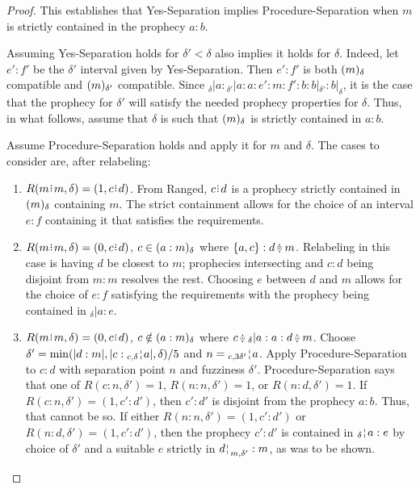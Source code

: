 \documentclass[12pt]{article}
\begin{document}
\begin{proof}
    This establishes that Yes-Separation implies Procedure-Separation when $m$ is strictly contained in the prophecy $a:b$.

    Assuming Yes-Separation holds for $\delta' < \delta$ also implies it holds for $\delta$. Indeed, let $e':f'$ be the $\delta'$ interval given by Yes-Separation. Then $e':f'$ is both $\halo{m}$ compatible and $\halo[\delta']{m}$ compatible. Since ${}_{\delta}|a : {}_{\delta'}|a : a : e':m: f':b:b|_{\delta'} : b|_{\delta}$, it is the case that the prophecy for $\delta'$ will satisfy the needed prophecy properties for $\delta $. Thus, in what follows, assume that $\delta$ is such that $\halo{m}$ is strictly contained in $a:b$. 

    Assume Procedure-Separation holds and apply it for $m$ and $\delta$. The cases to consider are, after relabeling:
    
    \begin{enumerate}
    \item $R(m \rint m, \delta) = (1, c \rint d)$. From Ranged, $c \rint d$ is a prophecy strictly contained in $\halo{m}$ containing $m$. The strict containment allows for the choice of an interval $e:f$ containing it that satisfies the requirements. 
    
    \item $R(m \rint m, \delta) = (0, c \rint d)$, $c \in \halo{a:m}$ where  $\{a, c\}: d \betneq m$. Relabeling in this case is having $d$ be closest to $m$; prophecies intersecting and $c:d$ being disjoint from $m:m$ resolves the rest. Choosing $e$ between $d$ and $m$ allows for the choice of $e:f$ satisfying the requirements with the prophecy being contained in ${}_{\delta}|a:e$.

    \item $R(m \rint m, \delta) = (0, c \rint d)$, $c \notin \halo{a:m}$ where  $c \betneq {}_{\delta}|a : a :  d \betneq m$. Choose $\delta' = \min( |d:m|, |c:\fuzbleft[c, \delta]{a} |,  \delta)/5$ and $n = \fuzbleft[c, 3 \delta']{a}$. Apply Procedure-Separation to $c:d$ with separation point $n$ and fuzziness $\delta'$. Procedure-Separation says that one of $R(c:n, \delta') = 1$, $R(n:n, \delta') = 1$, or $R(n:d, \delta')=1$. If $R(c:n, \delta') = (1, c':d')$, then $c':d'$ is disjoint from the prophecy $a:b$. Thus, that cannot be so. If either $R(n:n, \delta') = (1, c':d')$ or $R(n:d, \delta') = (1, c':d')$, then the prophecy $c':d'$ is contained in  $\fuzbleft{a} :  e$ by choice of $\delta'$ and a suitable $e$ strictly in $\fuzbright[m,\delta']{d} :m$, as was to be shown. 
    

\end{enumerate}
\end{proof}
\end{document}
